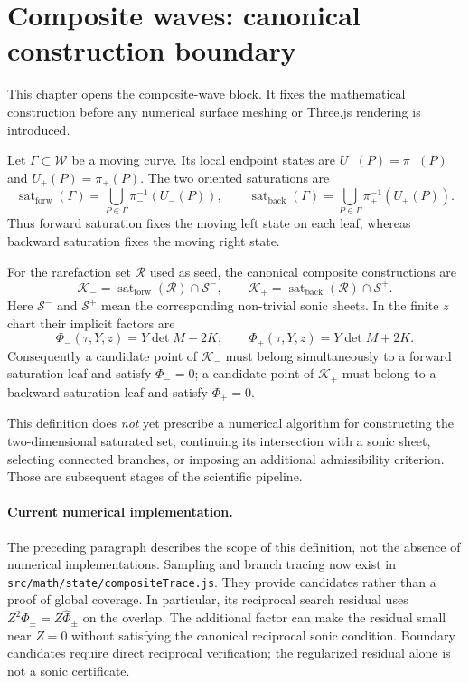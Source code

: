 \section{Composite waves: canonical construction boundary}

This chapter opens the composite-wave block.  It fixes the mathematical
construction before any numerical surface meshing or Three.js rendering is
introduced.

Let $\Gamma\subset\mathcal W$ be a moving curve.  Its local endpoint states
are $U_-(P)=\pi_-(P)$ and $U_+(P)=\pi_+(P)$.  The two oriented saturations are
\[
 \operatorname{sat}_{\mathrm{forw}}(\Gamma)
 =\bigcup_{P\in\Gamma}\pi_-^{-1}\!\left(U_-(P)\right),
 \qquad
 \operatorname{sat}_{\mathrm{back}}(\Gamma)
 =\bigcup_{P\in\Gamma}\pi_+^{-1}\!\left(U_+(P)\right).
\]
Thus forward saturation fixes the moving left state on each leaf, whereas
backward saturation fixes the moving right state.

For the rarefaction set $\mathcal R$ used as seed, the canonical composite
constructions are
\[
 \boxed{\mathcal K_-=
 \operatorname{sat}_{\mathrm{forw}}(\mathcal R)\cap\mathcal S^-},
 \qquad
 \boxed{\mathcal K_+=
 \operatorname{sat}_{\mathrm{back}}(\mathcal R)\cap\mathcal S^+}.
\]
Here $\mathcal S^-$ and $\mathcal S^+$ mean the corresponding non-trivial
sonic sheets.  In the finite $z$ chart their implicit factors are
\[
 \Phi_-(\tau,Y,z)=Y\det M-2K,
 \qquad
 \Phi_+(\tau,Y,z)=Y\det M+2K.
\]
Consequently a candidate point of $\mathcal K_-$ must belong simultaneously
to a forward saturation leaf and satisfy $\Phi_-=0$; a candidate point of
$\mathcal K_+$ must belong to a backward saturation leaf and satisfy
$\Phi_+=0$.

This definition does \emph{not} yet prescribe a numerical algorithm for
constructing the two-dimensional saturated set, continuing its intersection
with a sonic sheet, selecting connected branches, or imposing an additional
admissibility criterion.  Those are subsequent stages of the scientific
pipeline.

\paragraph{Current numerical implementation.}
The preceding paragraph describes the scope of this definition, not the absence
of numerical implementations. Sampling and branch tracing now exist in
\texttt{src/math/state/compositeTrace.js}. They provide candidates rather than
a proof of global coverage. In particular, its reciprocal search residual uses
$Z^2\Phi_\pm=Z\widehat\Phi_\pm$ on the overlap. The additional factor can make
the residual small near $Z=0$ without satisfying the canonical reciprocal sonic
condition. Boundary candidates require direct reciprocal verification; the
regularized residual alone is not a sonic certificate.
